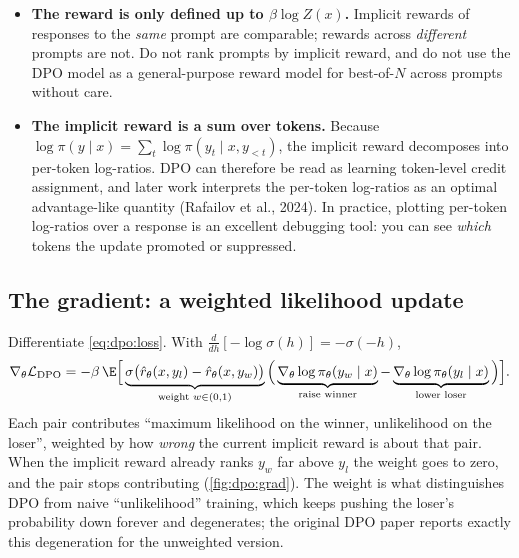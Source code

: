 \begin{itemize}
\item \textbf{The reward is only defined up to $\beta\log Z(x)$.} Implicit rewards of responses to
  the \emph{same} prompt are comparable; rewards across \emph{different} prompts are not. Do not
  rank prompts by implicit reward, and do not use the DPO model as a general-purpose reward model
  for best-of-$N$ across prompts without care.
\item \textbf{The implicit reward is a sum over tokens.} Because
  $\log\pi(y\mid x)=\sum_t\log\pi(y_t\mid x,y_{<t})$, the implicit reward decomposes into per-token
  log-ratios. DPO can therefore be read as learning token-level credit assignment, and later work
  interprets the per-token log-ratios as an optimal advantage-like quantity (Rafailov et al., 2024).
  In practice, plotting per-token log-ratios over a response is an excellent debugging tool:
  you can see \emph{which} tokens the update promoted or suppressed.
\end{itemize}

\subsection{The gradient: a weighted likelihood update}\label{sec:dpo:grad}

Differentiate \eqref{eq:dpo:loss}. With $\frac{d}{dh}[-\log\sigma(h)]=-\sigma(-h)$,
\begin{equation}
\nabla_\theta\mathcal{L}_{\text{DPO}} = -\beta\,\E\Big[\underbrace{\sigma\big(\hat r_\theta(x,y_l)-\hat r_\theta(x,y_w)\big)}_{\text{weight }w\in(0,1)}
\Big(\underbrace{\nabla_\theta\log\pi_\theta(y_w\mid x)}_{\text{raise winner}}
-\underbrace{\nabla_\theta\log\pi_\theta(y_l\mid x)}_{\text{lower loser}}\Big)\Big].
\label{eq:dpo:grad}
\end{equation}
Each pair contributes ``maximum likelihood on the winner, unlikelihood on the loser'', weighted
by how \emph{wrong} the current implicit reward is about that pair. When the implicit reward
already ranks $y_w$ far above $y_l$ the weight goes to zero, and the pair stops contributing
(\cref{fig:dpo:grad}). The weight is what distinguishes DPO from naive ``unlikelihood'' training,
which keeps pushing the loser's probability down forever and degenerates; the original DPO paper
reports exactly this degeneration for the unweighted version.

